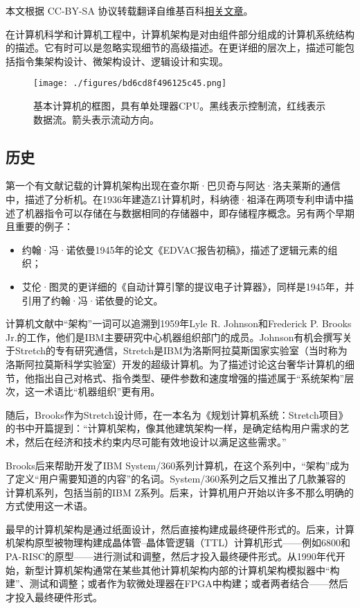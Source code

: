 
本文根据 CC-BY-SA 协议转载翻译自维基百科\href{https://en.wikipedia.org/wiki/Computer_architecture}{相关文章}。
  
在计算机科学和计算机工程中，计算机架构是对由组件部分组成的计算机系统结构的描述。它有时可以是忽略实现细节的高级描述。在更详细的层次上，描述可能包括指令集架构设计、微架构设计、逻辑设计和实现。
\begin{figure}[ht]
\centering
\texttt{[image: ./figures/bd6cd8f496125c45.png]}
\caption{基本计算机的框图，具有单处理器CPU。黑线表示控制流，红线表示数据流。箭头表示流动方向。} \label{fig_CORE_1}
\end{figure}
\subsection{历史}  
第一个有文献记载的计算机架构出现在查尔斯·巴贝奇与阿达·洛夫莱斯的通信中，描述了分析机。在1936年建造Z1计算机时，科纳德·祖泽在两项专利申请中描述了机器指令可以存储在与数据相同的存储器中，即存储程序概念。另有两个早期且重要的例子：

\begin{itemize}
\item 约翰·冯·诺依曼1945年的论文《EDVAC报告初稿》，描述了逻辑元素的组织；  
\item 艾伦·图灵的更详细的《自动计算引擎的提议电子计算器》，同样是1945年，并引用了约翰·冯·诺依曼的论文。
\end{itemize}

计算机文献中“架构”一词可以追溯到1959年Lyle R. Johnson和Frederick P. Brooks Jr.的工作，他们是IBM主要研究中心机器组织部门的成员。Johnson有机会撰写关于Stretch的专有研究通信，Stretch是IBM为洛斯阿拉莫斯国家实验室（当时称为洛斯阿拉莫斯科学实验室）开发的超级计算机。为了描述讨论这台奢华计算机的细节，他指出自己对格式、指令类型、硬件参数和速度增强的描述属于“系统架构”层次，这一术语比“机器组织”更有用。

随后，Brooks作为Stretch设计师，在一本名为《规划计算机系统：Stretch项目》的书中开篇提到：“计算机架构，像其他建筑架构一样，是确定结构用户需求的艺术，然后在经济和技术约束内尽可能有效地设计以满足这些需求。”

Brooks后来帮助开发了IBM System/360系列计算机，在这个系列中，“架构”成为了定义“用户需要知道的内容”的名词。System/360系列之后又推出了几款兼容的计算机系列，包括当前的IBM Z系列。后来，计算机用户开始以许多不那么明确的方式使用这一术语。

最早的计算机架构是通过纸面设计，然后直接构建成最终硬件形式的。后来，计算机架构原型被物理构建成晶体管–晶体管逻辑（TTL）计算机形式——例如6800和PA-RISC的原型——进行测试和调整，然后才投入最终硬件形式。从1990年代开始，新型计算机架构通常在某些其他计算机架构内部的计算机架构模拟器中“构建”、测试和调整；或者作为软微处理器在FPGA中构建；或者两者结合——然后才投入最终硬件形式。
